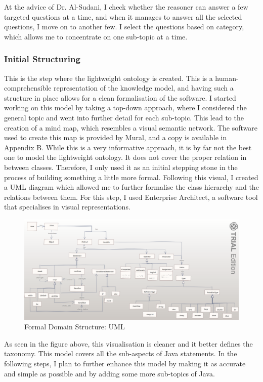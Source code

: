 \documentclass[titlepage]{article}
\begin{document}
\newline
At the advice of Dr. Al-Sudani, I check whether the reasoner can answer a few targeted questions at a time, and when it manages to answer all the selected questions, I move on to another few. I select the questions based on category, which allows me to concentrate on one sub-topic at a time.

\subsubsection{Initial Structuring}
This is the step where the lightweight ontology is created. This is a human-comprehensible representation of the knowledge model, and having such a structure in place allows for a clean formalisation of the software.
\newline
I started working on this model by taking a top-down approach, where I considered the general topic and went into further detail for each sub-topic. This lead to the creation of a mind map, which resembles a visual semantic network. The software used to create this map is provided by Mural\cite{mural}, and a copy is available in Appendix B.
\newline
While this is a very informative approach, it is by far not the best one to model the lightweight ontology. It does not cover the proper relation in between classes. Therefore, I only used it as an initial stepping stone in the process of building something a little more formal.
\newline
Following this visual, I created a UML diagram which allowed me to further formalise the class hierarchy and the relations between them. For this step, I used Enterprise Architect, a software tool that specialises in visual representations\cite{enterprisearchitect}.
\newline
\begin{figure}[h!]
\includegraphics[scale = 0.55, center]{uml.png}
\caption{Formal Domain Structure: UML}
\end{figure}
\newline
As seen in the figure above, this visualisation is cleaner and it better defines the taxonomy. This model covers all the sub-aspects of Java statements.
\newline
In the following steps, I plan to further enhance this model by making it as accurate and simple as possible and by adding some more sub-topics of Java.
\end{document}

